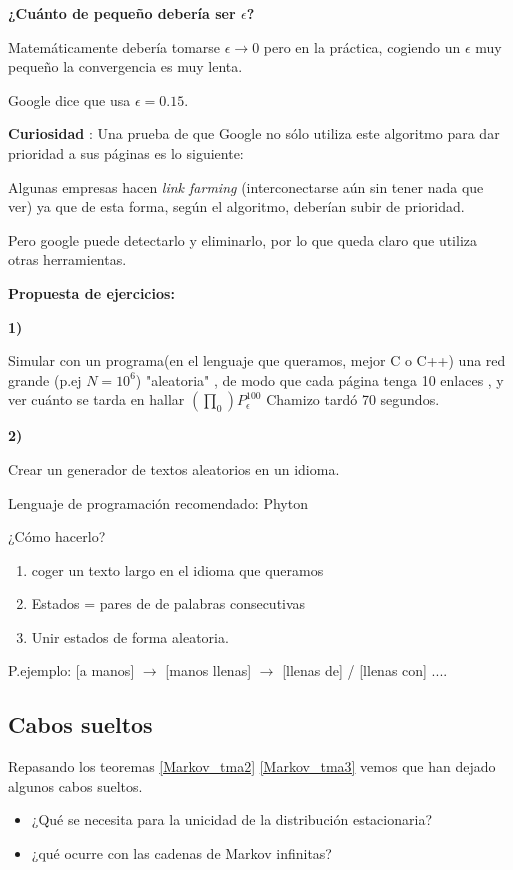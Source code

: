 \textbf{¿Cuánto de pequeño debería ser $\epsilon$?}

Matemáticamente debería tomarse $\epsilon\rightarrow 0$ pero en la práctica, cogiendo un $\epsilon$ muy pequeño la convergencia es muy lenta.

Google dice que usa $\epsilon = 0.15$.

\textbf{Curiosidad} : Una prueba de que Google no sólo utiliza este algoritmo para dar prioridad a sus páginas es lo siguiente:

Algunas empresas hacen \textit{link farming} (interconectarse aún sin tener nada que ver) ya que de esta forma, según el algoritmo, deberían subir de prioridad.

\begin{center}


\end{center}

Pero google puede detectarlo y eliminarlo, por lo que queda claro que utiliza otras herramientas.

\textbf{Propuesta de ejercicios:}

\textbf{1)}


	Simular con un programa(en el lenguaje que queramos, mejor C o C++) una red grande (p.ej $N= 10^6$) "aleatoria" , de modo que cada página tenga 10 enlaces , y ver cuánto se tarda en hallar $(\prod_0) P_{\epsilon}^{100}$
	Chamizo tardó 70 segundos.



\textbf{2)}


	Crear un generador de textos aleatorios en un idioma.

	Lenguaje de programación recomendado: Phyton

	¿Cómo hacerlo?
	\begin{enumerate}
		\item coger un texto largo en el idioma que queramos
		\item Estados = pares de de palabras consecutivas
		\item Unir estados de forma aleatoria.
	\end{enumerate}
	P.ejemplo: [a manos] $\rightarrow$ [manos llenas] $\rightarrow$ [llenas de] / [llenas con] ....

\subsection{Cabos sueltos}
 Repasando los teoremas \ref{Markov_tma2} \ref{Markov_tma3} vemos que han dejado algunos cabos sueltos.
\begin{itemize}
	\item ¿Qué se necesita para la unicidad de la distribución estacionaria?
	\item ¿qué ocurre con las cadenas de Markov infinitas?
\end{itemize}

